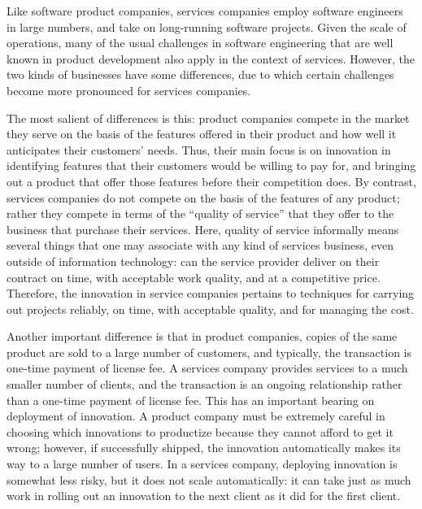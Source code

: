 Like software product companies, services companies employ software engineers in
large numbers, and take on long-running software projects. Given the scale of
operations, many of the usual challenges in software engineering that are well
known in product development also apply in the context of services.  However,
the two kinds of businesses have some differences, due to which certain
challenges become more pronounced for services companies.

The most salient of differences is this: product companies compete in the market
they serve on the basis of the features offered in their product and how well it
anticipates their customers' needs. Thus, their main focus is on innovation in
identifying features that their customers would be willing to pay for, and
bringing out a product that offer those features before their competition
does. By contrast, services companies do not compete on the basis of the
features of any product; rather they compete in terms of the ``quality of
service'' that they offer to the business that purchase their services. Here,
quality of service informally means several things that one may associate with
any kind of services business, even outside of information technology: can the
service provider deliver on their contract on time, with acceptable work
quality, and at a competitive price.  Therefore, the innovation in service
companies pertains to techniques for carrying out projects reliably, on time,
with acceptable quality, and for managing the cost.

Another important difference is that in product companies, copies of the same
product are sold to a large number of customers, and typically, the transaction
is one-time payment of license fee.  A services company provides services to a
much smaller number of clients, and the transaction is an ongoing relationship
rather than a one-time payment of license fee. This has an important bearing on
deployment of innovation.  A product company must be extremely careful in
choosing which innovations to productize because they cannot afford to get it
wrong; however, if successfully shipped, the innovation automatically makes its
way to a large number of users.  In a services company, deploying innovation is
somewhat less risky, but it does not scale automatically: it can take just as
much work in rolling out an innovation to the next client as it did for the
first client.


